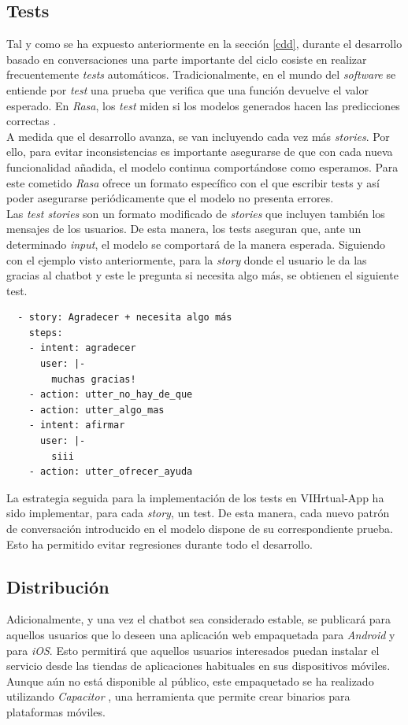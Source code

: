 \subsection{Tests}
\label{tests}
Tal y como se ha expuesto anteriormente en la sección \ref{cdd}, durante el desarrollo basado en conversaciones una parte importante del ciclo cosiste en realizar frecuentemente \textit{tests} automáticos. Tradicionalmente, en el mundo del \textit{software} se entiende por \textit{test} una prueba que verifica que una función devuelve el valor esperado. En \textit{Rasa}, los \textit{test} miden si los modelos generados hacen las predicciones correctas \cite{rasaTests}.\\

A medida que el desarrollo avanza, se van incluyendo cada vez más \textit{stories}. Por ello, para evitar inconsistencias es importante asegurarse de que con cada nueva funcionalidad añadida, el modelo continua comportándose como esperamos. Para este cometido \textit{Rasa} ofrece un formato específico con el que escribir tests y así poder asegurarse periódicamente que el modelo no presenta errores.\\

Las \textit{test stories} son un formato modificado de \textit{stories} que incluyen también los mensajes de los usuarios. De esta manera, los tests aseguran que, ante un determinado \textit{input}, el modelo se comportará de la manera esperada. Siguiendo con el ejemplo visto anteriormente, para la \textit{story} donde el usuario le da las gracias al chatbot y este le pregunta si necesita algo más, se obtienen el siguiente test.\\

\begin{verbatim}
  - story: Agradecer + necesita algo más
    steps:
    - intent: agradecer
      user: |-
        muchas gracias!
    - action: utter_no_hay_de_que
    - action: utter_algo_mas
    - intent: afirmar
      user: |-
        siii
    - action: utter_ofrecer_ayuda
\end{verbatim}

La estrategia seguida para la implementación de los tests en VIHrtual-App ha sido implementar, para cada \textit{story}, un test. De esta manera, cada nuevo patrón de conversación introducido en el modelo dispone de su correspondiente prueba. Esto ha permitido evitar regresiones durante todo el desarrollo.\\

\subsection{Distribución}
Adicionalmente, y una vez el chatbot sea considerado estable, se publicará para aquellos usuarios que lo deseen una aplicación web empaquetada para \textit{Android} y para \textit{iOS}. Esto permitirá que aquellos usuarios interesados puedan instalar el servicio desde las tiendas de aplicaciones habituales en sus dispositivos móviles.\\

Aunque aún no está disponible al público, este empaquetado se ha realizado utilizando \textit{Capacitor} \cite{capacitor}, una herramienta que permite crear binarios para plataformas móviles.\\


